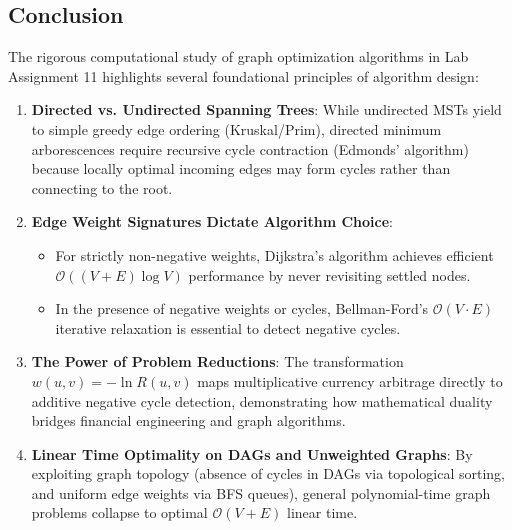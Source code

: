 \documentclass[12pt]{article}
\begin{document}
\subsection*{Conclusion}
The rigorous computational study of graph optimization algorithms in Lab Assignment 11 highlights several foundational principles of algorithm design:
\begin{enumerate}
    \item \textbf{Directed vs. Undirected Spanning Trees}: While undirected MSTs yield to simple greedy edge ordering (Kruskal/Prim), directed minimum arborescences require recursive cycle contraction (Edmonds' algorithm) because locally optimal incoming edges may form cycles rather than connecting to the root.
    \item \textbf{Edge Weight Signatures Dictate Algorithm Choice}:
    \begin{itemize}
        \item For strictly non-negative weights, Dijkstra's algorithm achieves efficient $\mathcal{O}((V + E) \log V)$ performance by never revisiting settled nodes.
        \item In the presence of negative weights or cycles, Bellman-Ford's $\mathcal{O}(V \cdot E)$ iterative relaxation is essential to detect negative cycles.
    \end{itemize}
    \item \textbf{The Power of Problem Reductions}: The transformation $w(u, v) = -\ln R(u, v)$ maps multiplicative currency arbitrage directly to additive negative cycle detection, demonstrating how mathematical duality bridges financial engineering and graph algorithms.
    \item \textbf{Linear Time Optimality on DAGs and Unweighted Graphs}: By exploiting graph topology (absence of cycles in DAGs via topological sorting, and uniform edge weights via BFS queues), general polynomial-time graph problems collapse to optimal $\mathcal{O}(V + E)$ linear time.
\end{enumerate}
\end{document}
